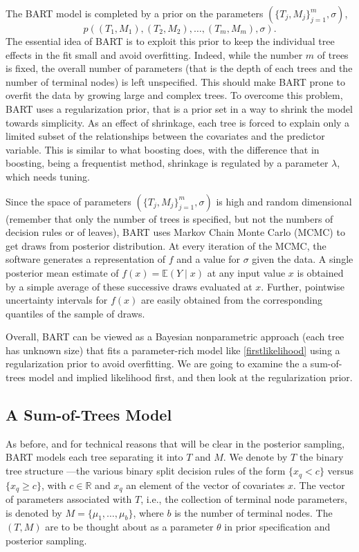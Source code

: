 \documentclass[a4paper,11pt]{article}
\begin{document}
 The BART model is completed by a prior on the parameters $ (\{T_j, M_j \}_{j=1}^m, \sigma)$, 
\[
p((T_1, M_1), (T_2, M_2), \ldots, (T_m, M_m), \sigma).
\]
The essential idea of BART is to exploit this prior to keep the individual tree effects in the fit small and avoid overfitting. Indeed, while the number $m$ of trees is fixed, the overall number of parameters (that is the depth of each trees and the number of terminal nodes) is left unspecified. This should make BART prone to overfit the data by growing large and complex trees. To overcome this problem, BART uses a regularization prior, that is a prior set in a way to shrink the model towards simplicity. As an effect of shrinkage, each tree is forced to explain only a limited subset of the relationships between the covariates and the predictor variable. This is similar to what boosting does, with the difference that in boosting, being a frequentist method, shrinkage is regulated by a parameter $\lambda$, which needs tuning. 

Since the space of parameters $ (\{T_j, M_j \}_{j=1}^m, \sigma)$ is high and random dimensional (remember that only the number of trees is specified, but not the numbers of decision rules or of leaves), BART uses Markov Chain Monte Carlo (MCMC) to get draws from posterior distribution.  At every iteration of the MCMC, the software generates a representation of $f$ and a value for $\sigma$ given the data. A single posterior mean estimate of \( f(x) = \mathbb{E}(Y \mid x) \) at any input value $x$ is obtained by a simple average of these successive draws evaluated at \( x \). Further, pointwise uncertainty intervals for \( f(x) \) are easily obtained from the corresponding quantiles of the sample of draws.

Overall, BART can be viewed as a Bayesian nonparametric approach (each tree has unknown size) that fits a parameter-rich model like \eqref{firstlikelihood} using a regularization prior to avoid overfitting. We are going to examine the a sum-of-trees model and implied likelihood first, and then look at the regularization prior.


\subsection{A Sum-of-Trees Model}
As before, and for technical reasons that will be clear in the posterior sampling, BART models each tree separating it into $T$ and $M$. We denote by \( T \) the binary tree structure —the various binary split decision rules of the form \( \{x_q < c\} \) versus \( \{x_q \geq c\} \), with \( c \in \mathbb{R} \) and $x_q$ an element of the vector of covariates $x$. The vector of parameters associated with \( T \), i.e., the collection of terminal node parameters, is denoted by \( M = \{\mu_1, \ldots, \mu_b\} \), where \( b \) is the number of terminal nodes. The $(T, M)$ are to be thought about as a parameter $\theta$ in prior specification and posterior sampling. 
\end{document}
